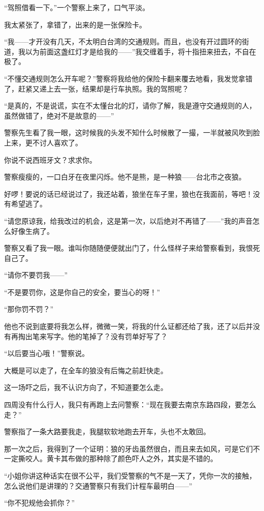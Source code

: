 \par “驾照借看一下。”一个警察上来了，口气平淡。
\par 我太紧张了，拿错了，出来的是一张保险卡。
\par “我——才开没有几天，不太明白台湾的交通规则。而且，也没有开过圆环的街道，我以为前面这盏红灯才是给我的——”我交缠着手，将十指扭来扭去，不自在极了。
\par “不懂交通规则怎么开车呢？”警察将我给他的保险卡翻来覆去地看，我发觉拿错了，赶紧又递上去一张，结果却是行车执照。我的驾照呢？
\par “是真的，不是说谎，实在不太懂台北的灯，请你了解，我是遵守交通规则的人，虽然做错了，绝对不是故意的——”
\par 警察先生看了我一眼，这时候我的头发不知什么时候散了一撮，一半就被风吹到脸上来，更不讨人喜欢了。
\par 你说不说西班牙文？求求你。
\par 警察瘦瘦的，一口白牙在夜里闪烁。他不是熊，是一种狼——台北市之夜狼。
\par 好啰！要说的话已经说过了，我还站着，狼坐在车子里，狼也在我面前，等吧！没有希望逃了。
\par “请您原谅我，给我改过的机会，这是第一次，以后绝对不再错了——”我的声音怎么好像生病了。
\par 警察又看了我一眼。谁叫你随随便便就出门了，什么怪样子来给警察看到，我恨死自己了。
\par “请你不要罚我——”
\par “不是要罚你，这是你自己的安全，要当心的呀！”
\par “那你罚不罚？”
\par 他也不说到底要将我怎么样，微微一笑，将我的什么证都还给了我，还了以后并没有再掏出笔来写字。他的笔掉了？没有罚单好写了？
\par “以后要当心哦！”警察说。
\par 大概是可以走了，在全车的狼没有后悔之前赶快走。
\par 这一场吓之后，我不认识方向了，不知道要怎么走。
\par 四周没有什么行人，我只有再跑上去问警察：“现在我要去南京东路四段，要怎么走？”
\par 警察指了一条大路要我走，我腿软软地跑去开车，头也不太敢回。
\par 那一次之后，我得到了一个证明：狼的牙齿虽然很白，而且来去如风，可是它们不一定撕咬人。黄卡其布做的那种除了颜色吓人之外，其实是不错的。
\par “小姐你讲这种话实在很不公平，我们受警察的气不是一天了，凭你一次的接触，怎么说他们是讲理的？交通警察只有我们计程车最明白——”
\par “你不犯规他会抓你？”

